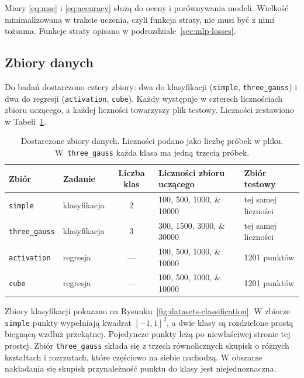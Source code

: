 Miary \eqref{eq:mse} i \eqref{eq:accuracy} służą do oceny i porównywania modeli. Wielkość minimalizowana w trakcie uczenia, czyli funkcja straty, nie musi być z nimi tożsama. Funkcje straty opisano w podrozdziale~\ref{sec:mlp-losses}.

\subsection{Zbiory danych}
\label{sec:problem-datasets}

Do badań dostarczono cztery zbiory: dwa do klasyfikacji (\texttt{simple}, \texttt{three\_gauss}) i dwa do regresji (\texttt{activation}, \texttt{cube}). Każdy występuje w czterech licznościach zbioru uczącego, a każdej liczności towarzyszy plik testowy. Liczności zestawiono w Tabeli~\ref{tab:datasets}.

\begin{table}[H]
    \centering
    \caption{Dostarczone zbiory danych. Liczności podano jako liczbę próbek w pliku. W~\texttt{three\_gauss} każda klasa ma jedną trzecią próbek.}
    \label{tab:datasets}
    \begin{tabular}{llcll}
        \toprule
        Zbiór & Zadanie & Liczba klas & Liczności zbioru uczącego & Zbiór testowy \\
        \midrule
        \texttt{simple} & klasyfikacja & 2 & \numlist{100;500;1000;10000} & tej samej liczności \\
        \texttt{three\_gauss} & klasyfikacja & 3 & \numlist{300;1500;3000;30000} & tej samej liczności \\
        \texttt{activation} & regresja & --- & \numlist{100;500;1000;10000} & \num{1201} punktów \\
        \texttt{cube} & regresja & --- & \numlist{100;500;1000;10000} & \num{1201} punktów \\
        \bottomrule
    \end{tabular}
\end{table}

Zbiory klasyfikacji pokazano na Rysunku~\ref{fig:datasets-classification}. W zbiorze \texttt{simple} punkty wypełniają kwadrat $[-1, 1]^2$, a dwie klasy są rozdzielone prostą biegnącą wzdłuż przekątnej. Pojedyncze punkty leżą po niewłaściwej stronie tej prostej. Zbiór \texttt{three\_gauss} składa się z trzech równolicznych skupisk o różnych kształtach i rozrzutach, które częściowo na siebie nachodzą. W obszarze nakładania się skupisk przynależność punktu do klasy jest niejednoznaczna.

